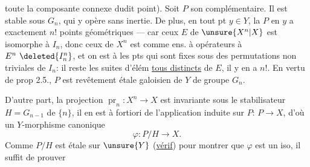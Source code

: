 toute la composante connexe dudit point).
Soit $P$ son complémentaire. Il est  stable sous $G_n$, qui y opère sans inertie.
De plus, en tout pt $y\in Y$, la  $P$ en $y$ a exactement $n!$ points géométriques --- car  ceux $E$ de $\unsure{X^n|X}$ est isomorphe à $I_n$, donc ceux de $X^n$ est  comme ens. à opérateurs à $E^n\ \deleted{I_n^n}$, et on est à  les pts qui sont fixes sous des permutations non triviales de $I_n$: il reste les suites d'élém \uline{tous distincts} de $E$, il y en a $n!$.
En vertu de prop 2.5., $P$ est  revêtement étale galoisien de $Y$ de groupe $G_n$.

D'autre part,  la  projection
$\operatorname{pr}_n:X^n\to X$  est invariante sous le stabilisateur $H=G_{n-1}$ de $\{n\}$,  il en est à fortiori de l'application induite sur $P$: $P\to X$, d'où un  $Y$-morphisme canonique
\[
\varphi:P/H\longrightarrow X.
\]
Comme $P/H$ est étale sur $\unsure{Y}$ (\uline{vérif})  pour montrer que $\varphi$ est un iso, il suffit de prouver
